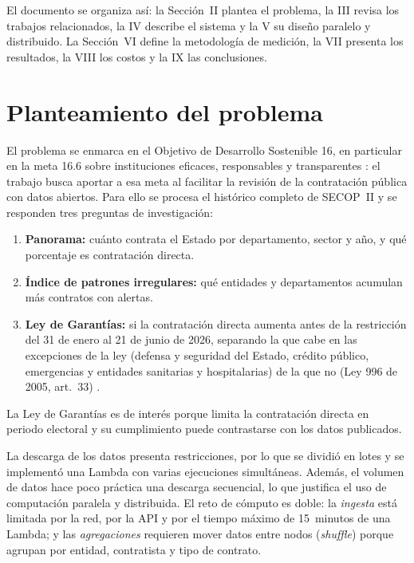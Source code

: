 \documentclass[conference]{IEEEtran}
\begin{document}
El documento se organiza así: la Sección~II plantea el problema, la III revisa los trabajos relacionados, la IV describe el sistema y la V su diseño paralelo y distribuido. La Sección~VI define la metodología de medición, la VII presenta los resultados, la VIII los costos y la IX las conclusiones.

\section{Planteamiento del problema}
El problema se enmarca en el Objetivo de Desarrollo Sostenible 16, en particular en la meta 16.6 sobre instituciones eficaces, responsables y transparentes \cite{onu_ods16}: el trabajo busca aportar a esa meta al facilitar la revisión de la contratación pública con datos abiertos. Para ello se procesa el histórico completo de SECOP~II y se responden tres preguntas de investigación:
\begin{enumerate}
  \item \textbf{Panorama:} cuánto contrata el Estado por departamento, sector y año, y qué porcentaje es contratación directa.
  \item \textbf{Índice de patrones irregulares:} qué entidades y departamentos acumulan más contratos con alertas.
  \item \textbf{Ley de Garantías:} si la contratación directa aumenta antes de la restricción del 31 de enero al 21 de junio de 2026, separando la que cabe en las excepciones de la ley (defensa y seguridad del Estado, crédito público, emergencias y entidades sanitarias y hospitalarias) de la que no (Ley 996 de 2005, art.~33) \cite{ley996}.
\end{enumerate}
La Ley de Garantías es de interés porque limita la contratación directa en periodo electoral y su cumplimiento puede contrastarse con los datos publicados.

La descarga de los datos presenta restricciones, por lo que se dividió en lotes y se implementó una Lambda con varias ejecuciones simultáneas. Además, el volumen de datos hace poco práctica una descarga secuencial, lo que justifica el uso de computación paralela y distribuida. El reto de cómputo es doble: la \emph{ingesta} está limitada por la red, por la API y por el tiempo máximo de 15~minutos de una Lambda; y las \emph{agregaciones} requieren mover datos entre nodos (\textit{shuffle}) porque agrupan por entidad, contratista y tipo de contrato.
\end{document}
